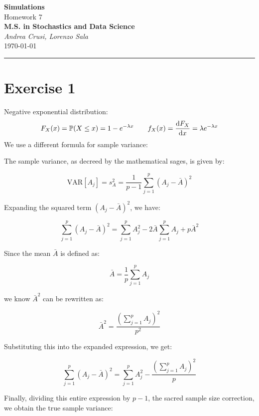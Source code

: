 \documentclass[12pt]{article}
\begin{document}
	\textcolor{UM_Brown}{
		\begin{center}
			\textbf{\Large Simulations}\\
			\vspace{5pt}
			Homework 7 \\
			\vspace{5pt}
			\textbf{M.S. in Stochastics and Data Science}\\
			\vspace{20pt}
			\textit{Andrea Crusi, Lorenzo Sala} \\
			\vspace{5pt}
			\today
		\end{center}
		\vspace{10pt}
		\hrule
	}
	
	
	
	
	\section{Exercise 1}
	Negative exponential distribution:
	\begin{equation*}
		F_X(x)=\mathbb{P}(X\leq x)=1-e^{-\lambda x}\qquad f_X(x)=\frac{\mathop{}\!\mathrm{d} F_X}{\mathop{}\!\mathrm{d} x}=\lambda e^{-\lambda x}
	\end{equation*}
	We use a different formula for sample variance:
	
	The sample variance, as decreed by the mathematical sages, is given by:
	
	\[
	\text{VAR}[A_j] = s^2_{A} = \frac{1}{p-1} \sum_{j=1}^{p} \left(A_j - \bar{A}\right)^2
	\]
	
	Expanding the squared term \(\left(A_j - \bar{A}\right)^2\), we have:
	
	\[
	\sum_{j=1}^p \left(A_j - \bar{A}\right)^2 = \sum_{j=1}^p A_j^2 - 2 \bar{A} \sum_{j=1}^p A_j + p \bar{A}^2
	\]
	
	Since the mean \(\bar{A}\) is defined as:
	
	\[
	\bar{A} = \frac{1}{p} \sum_{j=1}^p A_j
	\]
	
	we know \(\bar{A}^2\) can be rewritten as:
	
	\[
	\bar{A}^2 = \frac{\left(\sum_{j=1}^p A_j \right)^2}{p^2}
	\]
	
	Substituting this into the expanded expression, we get:
	
	\[
	\sum_{j=1}^p \left(A_j - \bar{A}\right)^2 = \sum_{j=1}^p A_j^2 - \frac{\left(\sum_{j=1}^p A_j \right)^2}{p}
	\]
	
	Finally, dividing this entire expression by \(p-1\), the sacred sample size correction, we obtain the true sample variance:
	
\end{document}
